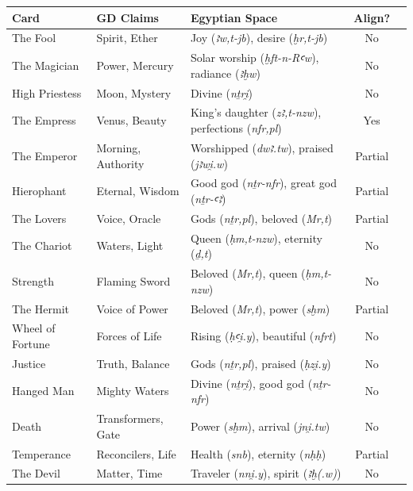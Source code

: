 \documentclass[11pt, a4paper]{article}
\begin{document}
\begin{longtable}{@{}p{1.2in}p{1.2in}p{1.2in}cp{0.5in}@{}}
\toprule
\textbf{Card} & \textbf{GD Claims} & \textbf{Egyptian Space} & \textbf{Align?} \\
\midrule
\endhead
The Fool & Spirit, Ether & Joy (\textit{ꜣw,t-jb}), desire (\textit{ḫr,t-jb}) & \textcolor{mismatch}{No} \\
The Magician & Power, Mercury & Solar worship (\textit{ḫft-n-Rꜥw}), radiance (\textit{ꜣḫw}) & \textcolor{mismatch}{No} \\
High Priestess & Moon, Mystery & Divine (\textit{nṯri̯}) & \textcolor{mismatch}{No} \\
The Empress & Venus, Beauty & King's daughter (\textit{zꜣ,t-nzw}), perfections (\textit{nfr,pl}) & \textcolor{match}{Yes} \\
The Emperor & Morning, Authority & Worshipped (\textit{dwꜣ.tw}), praised (\textit{jꜣwi̯.w}) & \textcolor{mismatch}{Partial} \\
Hierophant & Eternal, Wisdom & Good god (\textit{nṯr-nfr}), great god (\textit{nṯr-ꜥꜣ}) & \textcolor{match}{Partial} \\
The Lovers & Voice, Oracle & Gods (\textit{nṯr,pl}), beloved (\textit{Mr,t}) & \textcolor{match}{Partial} \\
The Chariot & Waters, Light & Queen (\textit{ḥm,t-nzw}), eternity (\textit{ḏ,t}) & \textcolor{mismatch}{No} \\
Strength & Flaming Sword & Beloved (\textit{Mr,t}), queen (\textit{ḥm,t-nzw}) & \textcolor{mismatch}{No} \\
The Hermit & Voice of Power & Beloved (\textit{Mr,t}), power (\textit{sḫm}) & \textcolor{match}{Partial} \\
Wheel of Fortune & Forces of Life & Rising (\textit{ḥꜥi̯.y}), beautiful (\textit{nfrt}) & \textcolor{mismatch}{No} \\
Justice & Truth, Balance & Gods (\textit{nṯr,pl}), praised (\textit{ḥzi̯.y}) & \textcolor{mismatch}{No} \\
Hanged Man & Mighty Waters & Divine (\textit{nṯri̯}), good god (\textit{nṯr-nfr}) & \textcolor{mismatch}{No} \\
Death & Transformers, Gate & Power (\textit{sḫm}), arrival (\textit{jni̯.tw}) & \textcolor{mismatch}{No} \\
Temperance & Reconcilers, Life & Health (\textit{snb}), eternity (\textit{nḥḥ}) & \textcolor{match}{Partial} \\
The Devil & Matter, Time & Traveler (\textit{nni̯.y}), spirit (\textit{ꜣḫ(.w)}) & \textcolor{mismatch}{No} \\

\end{longtable}
\end{document}
